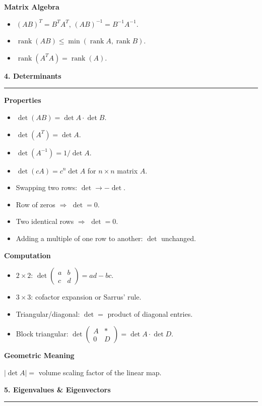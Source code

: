 \documentclass[10pt,twocolumn]{article}
\newcommand{\sect}[1]{\medskip\noindent\textbf{\large #1}\medskip\hrule\smallskip}
\newcommand{\subsect}[1]{\smallskip\noindent\textbf{#1}\par}
\DeclareMathOperator{\rank}{rank}
\begin{document}
\subsect{Matrix Algebra}
\begin{itemize}[nosep,leftmargin=*]
\item $(AB)^T=B^TA^T$, \quad $(AB)^{-1}=B^{-1}A^{-1}$.
\item $\rank(AB)\le\min(\rank A,\rank B)$.
\item $\rank(A^T A)=\rank(A)$.
\end{itemize}

\sect{4. Determinants}

\subsect{Properties}
\begin{itemize}[nosep,leftmargin=*]
\item $\det(AB)=\det A\cdot\det B$.
\item $\det(A^T)=\det A$.
\item $\det(A^{-1})=1/\det A$.
\item $\det(cA)=c^n\det A$ for $n\times n$ matrix $A$.
\item Swapping two rows: $\det\to-\det$.
\item Row of zeros $\Rightarrow$ $\det=0$.
\item Two identical rows $\Rightarrow$ $\det=0$.
\item Adding a multiple of one row to another: $\det$ unchanged.
\end{itemize}

\subsect{Computation}
\begin{itemize}[nosep,leftmargin=*]
\item $2\times 2$: $\det\begin{pmatrix}a&b\\c&d\end{pmatrix}=ad-bc$.
\item $3\times 3$: cofactor expansion or Sarrus' rule.
\item Triangular/diagonal: $\det=$ product of diagonal entries.
\item Block triangular: $\det\begin{pmatrix}A&*\\0&D\end{pmatrix}=\det A\cdot\det D$.
\end{itemize}

\subsect{Geometric Meaning}
$|\det A|=$ volume scaling factor of the linear map.

\sect{5. Eigenvalues \& Eigenvectors}
\end{document}
